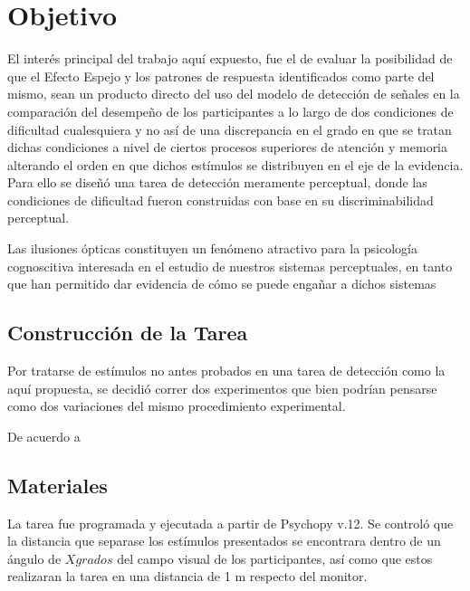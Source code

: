 \section{Objetivo}

El interés principal del trabajo aquí expuesto, fue el de evaluar la posibilidad de que el Efecto Espejo y los patrones de respuesta identificados como parte del mismo, sean un producto directo del uso del modelo de detección de señales en la comparación del desempeño de los participantes a lo largo de dos condiciones de dificultad cualesquiera y no así de una discrepancia en el grado en que se tratan dichas condiciones a nivel de ciertos procesos superiores de atención y memoria alterando el orden en que dichos estímulos se distribuyen en el eje de la evidencia. Para ello se diseñó una tarea de detección meramente perceptual, donde las condiciones de dificultad fueron construidas con base en su discriminabilidad perceptual. 

Las ilusiones ópticas constituyen un fenómeno atractivo para la psicología cognoscitiva interesada en el estudio de nuestros sistemas perceptuales, en tanto que han permitido dar evidencia de cómo se puede engañar a dichos sistemas 


\subsection{Construcción de la Tarea}

Por tratarse de estímulos no antes probados en una tarea de detección como la aquí propuesta, se decidió correr dos experimentos que bien podrían pensarse como dos variaciones del mismo procedimiento experimental. 

De acuerdo a 




\subsection{Materiales}
La tarea fue programada y ejecutada a partir de Psychopy v.12. Se controló que la distancia que separase los estímulos presentados se encontrara dentro de un ángulo de $X grados$ del campo visual de los participantes, así como que estos realizaran la tarea en una distancia de 1 m respecto del monitor.

